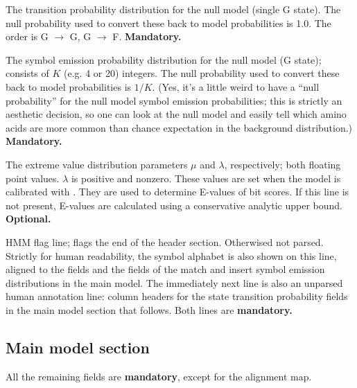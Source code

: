 \begin{wideitem}
\item [\emprog{NULT  <d> <d>}] The transition probability distribution
for the null model (single G state). The null probability used to
convert these back to model probabilities is 1.0. The order is G
$\rightarrow$ G, G $\rightarrow$ F.
\textbf{Mandatory.}

\item [\emprog{NULE  <d>*K}] The symbol emission probability
distribution for the null model (G state); consists of $K$ (e.g. 4 or
20) integers. The null probability used to convert these back to model
probabilities is $1/K$. (Yes, it's a little weird to have a ``null
probability'' for the null model symbol emission probabilities; this
is strictly an aesthetic decision, so one can look at the null model
and easily tell which amino acids are more common than chance
expectation in the background distribution.) 
\textbf{Mandatory.}

\item [\emprog{EVD   <f> <f>}] The extreme value distribution
parameters $\mu$ and $\lambda$, respectively; both floating point
values. $\lambda$ is positive and nonzero. These values are set when
the model is calibrated with . They are used to
determine E-values of bit scores. If this line is not present,
E-values are calculated using a conservative analytic upper bound.
\textbf{Optional.}

\item [\emprog{HMM    }] HMM flag line; flags the end of the header
section. Otherwised not parsed. Strictly for human readability, the
symbol alphabet is also shown on this line, aligned to the 
fields and the fields of the match and insert symbol emission
distributions in the main model. The immediately next line is also an
unparsed human annotation line: column headers for the state
transition probability fields in the main model section that follows.
Both lines are \textbf{mandatory.}

\end{wideitem}

\subsection{Main model section}

All the remaining fields are \textbf{mandatory}, except for the
alignment map.

